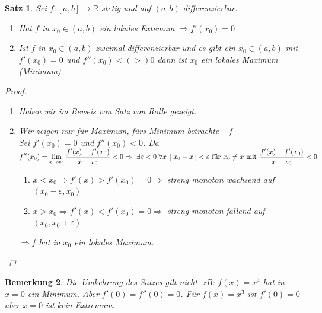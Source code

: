 \documentclass[a4paper,titlepage,oneside]{article}
\def\R{\ensuremath{\mathbb{R}} }
\renewcommand{\epsilon}{\ensuremath{\varepsilon} }
\def\sp{\hspace{0,1cm}}
\newcommand{\limAB}[3][x]{\ensuremath{\lim\limits_{#1 \rightarrow #2}{#3}}}
\newcommand{\limA}[2][x_0]{\limAB{#1}{#2}}
\newcommand{\abs}[1]{\ensuremath{\left|\:#1\:\right|}}
\theoremstyle{thmstyle}
\newtheorem{satz}{Satz}[section]
\newtheorem{bem}[satz]{Bemerkung}
\theoremstyle{subthmstyle}
\begin{document}
\begin{satz}
Sei $f : [a,b] \to \R $ stetig und auf $(a,b)$ differenzierbar.
\begin{enumerate}
\item Hat $f$ in $x_0 \in (a,b) $ ein lokales Extemum $ \Rightarrow f'(x_0) = 0$
\item Ist $f$ in $x_0 \in (a,b) $ zweimal differenzierbar und es gibt ein $x_0 \in (a,b)$ mit $f'(x_0) = 0$ und $f''(x_0) <(>) 0$ dann ist $x_0$ ein lokales Maximum (Minimum)
\end{enumerate}
\begin{proof}
\begin{enumerate}
\item Haben wir im Beweis von Satz von Rolle gezeigt.
\item Wir zeigen nur für Maximum, fürs Minimum betrachte $-f$\\
Sei $f'(x_0) = 0$ und $f''(x_0) < 0$. Da $ \displaystyle f''(x_0) = \limA{\frac{f'(x) - f'(x_0)}{x - x_0}} < 0 \Rightarrow \sp \exists \epsilon < 0 \sp \forall x \sp \abs{x_0 - x} < \epsilon \text{ für } x_0 \ne x \text{ mit } \frac{f'(x) - f'(x_0)}{x - x_0} < 0$
\begin{enumerate}
\item[Fall 1] $x < x_0 \Rightarrow f'(x) > f'(x_0) = 0 \Rightarrow $ streng monoton wachsend auf $(x_0 - \epsilon, x_0)$
\item[Fall 2] $x > x_0 \Rightarrow f'(x) < f'(x_0) = 0  \Rightarrow $ streng monoton fallend auf $(x_0, x_0 + \epsilon)$
\end{enumerate}
$\Rightarrow f$ hat in $x_0$ ein lokales Maximum.
\end{enumerate}
\end{proof}
\end{satz}

\begin{bem}
Die Umkehrung des Satzes gilt nicht.
zB: $f(x) = x^4$ hat in $x = 0$ ein Minimum. Aber $f'(0) = f''(0) = 0$. Für $f(x) = x^3$ ist $f'(0) = 0$ aber $ x = 0$ ist kein Extremum.\\
\end{bem}
\end{document}
